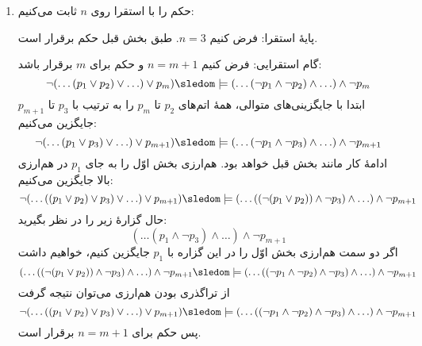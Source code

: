 \begin{ans}
\begin{enumerate}[label=(\alph*)]
      \item
      حکم را با استقرا روی
      $n$
      ثابت می‌کنیم:
  
      پایهٔ استقرا:
      فرض کنیم $n = 3$. طبق بخش قبل حکم برقرار است.
  
      گام استقرایی:
      فرض کنیم $n = m+1$ و حکم برای $m$ برقرار باشد:
      $$\neg(\ldots(p_1\vee p_2)\vee \ldots)\vee p_m)\sledom\models (\ldots(\neg p_1\wedge \neg p_2)\wedge\ldots)\wedge\neg p_m$$
      ابتدا با جایگزینی‌های متوالی، همهٔ اتم‌های $p_2$ تا $p_m$ را به ترتیب با $p_3$ تا $p_{m+1}$ جایگزین می‌کنیم:
      $$\neg(\ldots(p_1\vee p_3)\vee \ldots)\vee p_{m+1})\sledom\models (\ldots(\neg p_1\wedge \neg p_3)\wedge\ldots)\wedge\neg p_{m+1}$$
      ادامهٔ کار مانند بخش قبل خواهد بود. هم‌ارزی بخش اوّل را به جای $p_1$ در هم‌ارزی بالا جایگزین می‌کنیم:
      $$\neg(\ldots((p_1 \vee p_2) \vee p_3)\vee \ldots)\vee p_{m+1})\sledom\models (\ldots((\neg (p_1 \vee p_2))\wedge \neg p_3)\wedge\ldots)\wedge\neg p_{m+1}$$
      حال گزارهٔ زیر را در نظر بگیرید:
      $$(\ldots(p_1\wedge \neg p_3)\wedge\ldots)\wedge\neg p_{m+1}$$
      اگر دو سمت هم‌ارزی بخش اوّل را در این گزاره با $p_1$ جایگزین کنیم، خواهیم داشت
      $$ (\ldots((\neg (p_1 \vee p_2))\wedge \neg p_3)\wedge\ldots)\wedge\neg p_{m+1} \sledom\models (\ldots((\neg p_1 \wedge \neg p_2) \wedge \neg p_3)\wedge\ldots)\wedge\neg p_{m+1}  $$
      از تراگذری بودن هم‌ارزی می‌توان نتیجه گرفت
      $$ \neg(\ldots((p_1 \vee p_2) \vee p_3)\vee \ldots)\vee p_{m+1}) \sledom\models (\ldots((\neg p_1 \wedge \neg p_2) \wedge \neg p_3)\wedge\ldots)\wedge\neg p_{m+1}  $$
      پس حکم برای $n = m+1$ برقرار است.
    \end{enumerate}
\end{ans}
  
